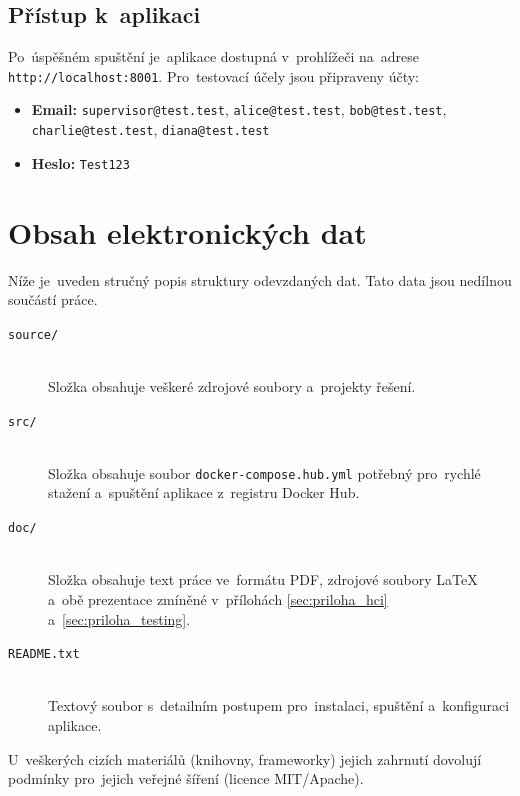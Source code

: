 \documentclass[
  master,
  program=ainfvs,
  printversion,
  figures=false,
  tables=false,
  glossaries,
  index
]{kidiplom}
\begin{document}
\subsection{Přístup k~aplikaci}
Po~úspěšném spuštění je~aplikace dostupná v~prohlížeči na~adrese \texttt{http://\-lo\-cal\-ho\-st\-:8001}. Pro~testovací účely jsou připraveny účty:
\begin{itemize}
    \item \textbf{Email:} \texttt{supervisor@test.test}, \texttt{alice@test.test}, \texttt{bob@\-te\-st\-.\-te\-st}, \texttt{charlie@test.test}, \texttt{diana@test.test}
    \item \textbf{Heslo:} \texttt{Test123}
\end{itemize}

\section{Obsah elektronických dat} \label{sec:ObsahData}
Níže je~uveden stručný popis struktury odevzdaných dat. Tato data jsou nedílnou součástí práce.

\begin{description}
    \item[\texttt{source/}] \hfill \\
    Složka obsahuje veškeré zdrojové soubory a~projekty řešení.
    
    \item[\texttt{src/}] \hfill \\
    Složka obsahuje soubor \texttt{docker-compose.hub.yml} potřebný pro~rychlé stažení a~spuštění aplikace z~registru Docker Hub.
    
    \item[\texttt{doc/}] \hfill \\
    Složka obsahuje text práce ve~formátu PDF, zdrojové soubory \LaTeX{} a~obě prezentace zmíněné v~přílohách \ref{sec:priloha_hci} a~\ref{sec:priloha_testing}.
    
    \item[\texttt{README.txt}] \hfill \\
    Textový soubor s~detailním postupem pro~instalaci, spuštění a~konfiguraci aplikace.
\end{description}

U~veškerých cizích materiálů (knihovny, frameworky) jejich zahrnutí dovolují podmínky pro~jejich veřejné šíření (licence MIT/Apache).

\end{document}
